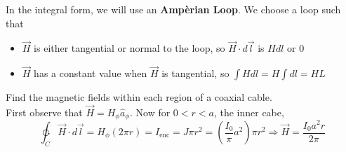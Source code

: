 \documentclass[12pt]{article}
\begin{document}
In the integral form, we will use an \textbf{Amp\`erian Loop}. We choose a loop such that

\begin{itemize}
	\item $\vec{H}$ is either tangential or normal to the loop, so $\vec{H}\cdot d\vec{l}$ is $Hdl$ or $0$
	\item $\vec{H}$ has a constant value when $\vec{H}$ is tangential, so $\int Hdl = H\int dl = HL$
\end{itemize}

\begin{ex}
	Find the magnetic fields within each region of a coaxial cable. \\
	First observe that $\vec{H} = H_\phi\hat{a}_\phi$. Now for $0 < r < a$, the inner cabe,
	$$\ointctrclockwise_C \vec{H} \cdot d\vec{l} = H_\phi(2\pi r) = I_{\text{enc}} = J\pi r^2 = \left(\frac{I_0}\pi a^2\right)\pi r^2 \Rightarrow \vec{H} = \frac{I_0a^2r}{2\pi}$$
\end{ex}
\end{document}
